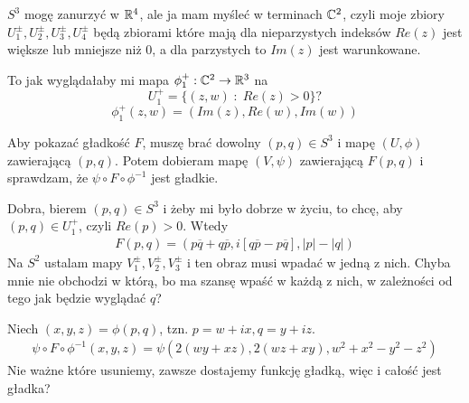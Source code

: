 \documentclass{article}
\begin{document}
$S^3$ mogę zanurzyć w $\mathbb{R}^4$, ale ja mam myśleć w terminach $\mathbb{C}^2$, czyli moje zbiory $U_1^\pm,U_2^\pm,U_3^\pm,U_4^\pm$ będą zbiorami które mają dla nieparzystych indeksów $Re(z)$ jest większe lub mniejsze niż $0$, a dla parzystych to $Im(z)$ jest warunkowane.

To jak wyglądałaby mi mapa $\phi_1^+:\mathbb{C}^2\to\mathbb{R}^3$ na
$$U_1^+=\{(z,w)\;:\;Re(z)>0\}?$$
$$\phi_1^+(z,w)=(Im(z), Re(w),Im(w))$$

Aby pokazać gładkość $F$, muszę brać dowolny $(p,q)\in S^3$ i mapę $(U,\phi)$ zawierającą $(p,q)$. Potem dobieram mapę $(V,\psi)$ zawierającą $F(p,q)$ i sprawdzam, że $\psi\circ F\circ\phi^{-1}$ jest gładkie.

Dobra, bierem $(p,q)\in S^3$ i żeby mi było dobrze w życiu, to chcę, aby $(p,q)\in U_1^+$, czyli $Re(p)>0$. Wtedy
\begin{align*}
    F(p,q)=(p\overline{q}+q\overline{p}, i[q\overline{p}-p\overline{q}], |p|-|q|)
\end{align*}
Na $S^2$ ustalam mapy $V_1^\pm,V_2^\pm,V_3^\pm$ i ten obraz musi wpadać w jedną z nich. Chyba mnie nie obchodzi w którą, bo ma szansę wpaść w każdą z nich, w zależności od tego jak będzie wyglądać $q$?


Niech $(x,y,z)=\phi(p,q)$, tzn. $p=w+ix,q=y+iz$.
\begin{align*}
    \psi\circ F\circ\phi^{-1}(x, y, z)=\psi(2(wy+xz),2(wz+xy),w^2+x^2-y^2-z^2)
\end{align*}
Nie ważne które usuniemy, zawsze dostajemy funkcję gładką, więc i całość jest gładka?
\end{document}
